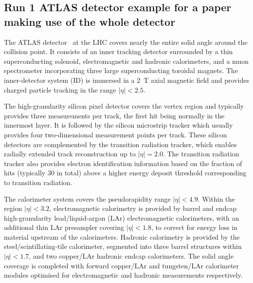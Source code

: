 \subsection{Run 1 ATLAS detector example for a paper making use of the whole detector}
\label{sec:atlas2}

The ATLAS detector~\cite{PERF-2007-01} at the LHC covers nearly the entire solid angle around the collision point.
It consists of an inner tracking detector surrounded by a thin superconducting solenoid, electromagnetic and hadronic calorimeters,
and a muon spectrometer incorporating three large superconducting toroidal magnets.
The inner-detector system (ID) is immersed in a \SI{2}{\tesla} axial magnetic field 
and provides charged particle tracking in the range \(|\eta| < 2.5\).

The high-granularity silicon pixel detector covers the vertex region and typically provides three measurements per track, 
the first hit being normally in the innermost layer.
It is followed by the silicon microstrip tracker which usually provides four two-dimensional measurement points per track.
These silicon detectors are complemented by the transition radiation tracker,
which enables radially extended track reconstruction up to \(|\eta| = 2.0\). 
The transition radiation tracker also provides electron identification information 
based on the fraction of hits (typically 30 in total) above a higher energy deposit threshold corresponding to transition radiation.

The calorimeter system covers the pseudorapidity range \(|\eta| < 4.9\).
Within the region \(|\eta|< 3.2\), electromagnetic calorimetry is provided by barrel and 
endcap high-granularity lead/liquid-argon (LAr) electromagnetic calorimeters,
with an additional thin LAr presampler covering \(|\eta| < 1.8\),
to correct for energy loss in material upstream of the calorimeters.
Hadronic calorimetry is provided by the steel/scintillating-tile calorimeter,
segmented into three barrel structures within \(|\eta| < 1.7\), and two copper/LAr hadronic endcap calorimeters.
The solid angle coverage is completed with forward copper/LAr and tungsten/LAr calorimeter modules
optimised for electromagnetic and hadronic measurements respectively.

